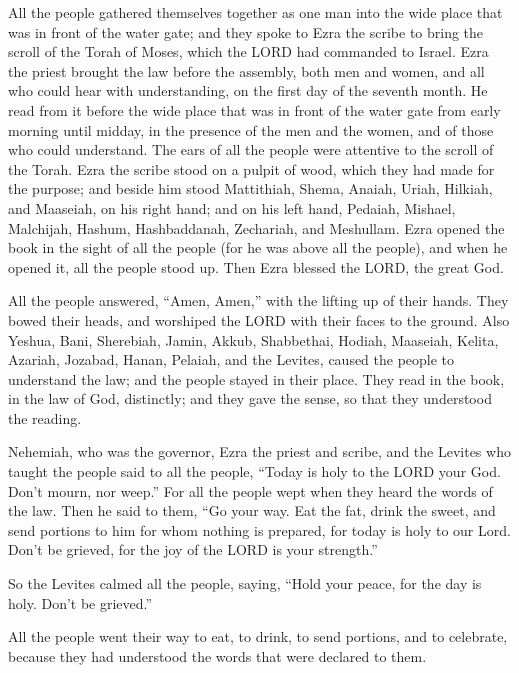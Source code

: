 \mychapter{} \myverse*{}All the people gathered themselves together as one man into the
wide place that was in front of the water gate; and they spoke to Ezra the scribe to bring the scroll of the Torah
of Moses, which the LORD had commanded to Israel.
\myverse{}Ezra the priest brought the law before the assembly, both men and women, and
all who could hear with understanding, on the first day of the seventh month.
\myverse{}He read from it before the wide place that was in front of the water gate from
early morning until midday, in the presence of the men and the women, and of those who could understand.
The ears of all the people were attentive to the scroll of the Torah.
\myverse{}Ezra the scribe stood on a pulpit of wood, which they had made for the purpose;
and beside him stood Mattithiah, Shema, Anaiah, Uriah, Hilkiah, and Maaseiah, on his right hand; and on
his left hand, Pedaiah, Mishael, Malchijah, Hashum, Hashbaddanah, Zechariah, and Meshullam.
\myverse{}Ezra opened the book in the sight of all the people (for he was above all the
people), and when he opened it, all the people stood up.
\myverse{}Then Ezra blessed the LORD, the great God.

All the people answered, “Amen, Amen,” with the lifting up of their hands. They bowed their
heads, and worshiped the LORD with their faces to the ground.
\myverse{}Also Yeshua, Bani, Sherebiah, Jamin, Akkub, Shabbethai, Hodiah, Maaseiah, Kelita,
Azariah, Jozabad, Hanan, Pelaiah, and the Levites, caused the people to understand the law; and the people
stayed in their place.
\myverse{}They read in the book, in the law of God, distinctly; and they gave the sense,
so that they understood the reading.

\myverse{}Nehemiah, who was the governor, Ezra the priest and scribe, and
the Levites who taught the people said to all the people, “Today is holy to the LORD your God. Don’t mourn,
nor weep.” For all the people wept when they heard the words of the law.
\myverse{}Then he said to them, “Go your way. Eat the fat, drink the sweet, and send
portions to him for whom nothing is prepared, for today is holy to our Lord. Don’t be grieved, for the
joy of the LORD is your strength.”

\myverse{}So the Levites calmed all the people, saying, “Hold your peace,
for the day is holy. Don’t be grieved.”

\myverse{}All the people went their way to eat, to drink, to send portions,
and to celebrate, because they had understood the words that were declared to them.

